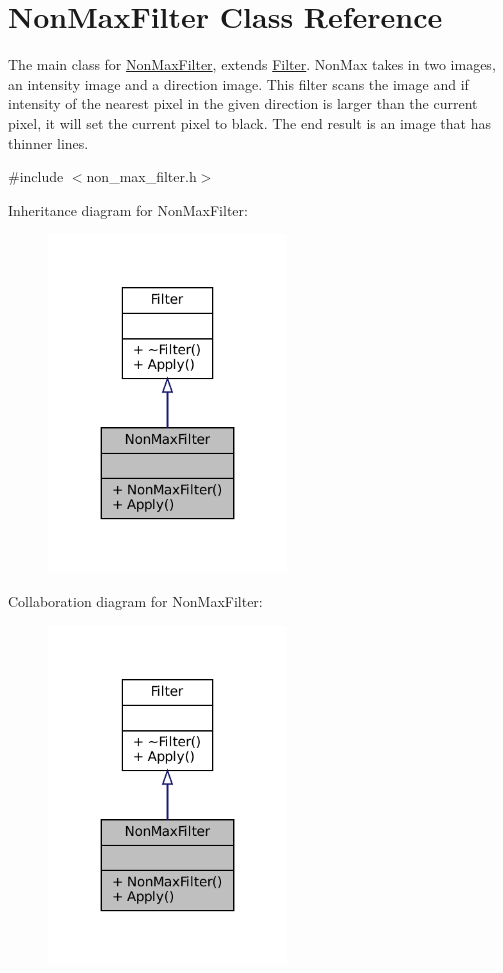 \hypertarget{classNonMaxFilter}{}\section{Non\+Max\+Filter Class Reference}
\label{classNonMaxFilter}


The main class for \hyperlink{classNonMaxFilter}{Non\+Max\+Filter}, extends \hyperlink{classFilter}{Filter}. Non\+Max takes in two images, an intensity image and a direction image. This filter scans the image and if intensity of the nearest pixel in the given direction is larger than the current pixel, it will set the current pixel to black. The end result is an image that has thinner lines.  




{\ttfamily \#include $<$non\+\_\+max\+\_\+filter.\+h$>$}



Inheritance diagram for Non\+Max\+Filter\+:\nopagebreak
\begin{figure}[H]
\begin{center}
\leavevmode
\includegraphics[width=179pt]{classNonMaxFilter__inherit__graph}
\end{center}
\end{figure}


Collaboration diagram for Non\+Max\+Filter\+:\nopagebreak
\begin{figure}[H]
\begin{center}
\leavevmode
\includegraphics[width=179pt]{classNonMaxFilter__coll__graph}
\end{center}
\end{figure}
